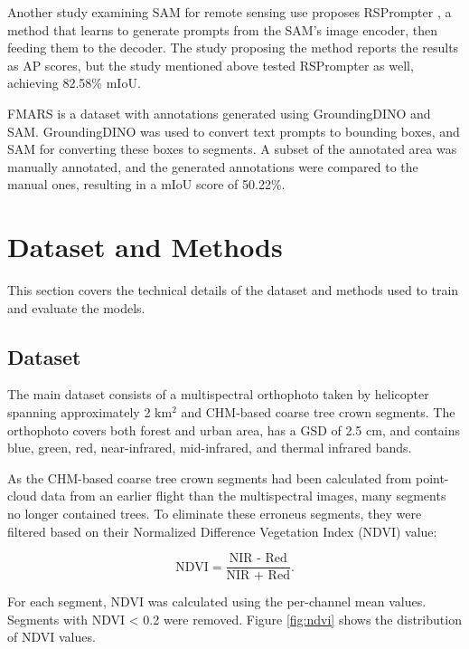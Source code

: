 \documentclass[english, 12pt, a4paper, sci, utf8, a-2b, online]{aaltothesis}
\begin{document}
Another study examining SAM for remote sensing use proposes RSPrompter \cite{rsprompter}, a method that learns to generate prompts from the SAM's image encoder, then feeding them to the decoder. The study proposing the method reports the results as AP scores, but the study mentioned above tested RSPrompter as well, achieving 82.58\% mIoU. \cite{sam-treecrown}

FMARS \cite{fmars} is a dataset with annotations generated using GroundingDINO and SAM. GroundingDINO was used to convert text prompts to bounding boxes, and SAM for converting these boxes to segments. A subset of the annotated area was manually annotated, and the generated annotations were compared to the manual ones, resulting in a mIoU score of 50.22\%.

\newpage
\section{Dataset and Methods}

This section covers the technical details of the dataset and methods used to train and evaluate the models.

\subsection{Dataset}

The main dataset consists of a multispectral orthophoto taken by helicopter spanning approximately 2 km$^2$ and CHM-based coarse tree crown segments. The orthophoto covers both forest and urban area, has a GSD of 2.5 cm, and contains blue, green, red, near-infrared, mid-infrared, and thermal infrared bands.

As the CHM-based coarse tree crown segments had been calculated from point-cloud data from an earlier flight than the multispectral images, many segments no longer contained trees. To eliminate these erroneus segments, they were filtered based on their Normalized Difference Vegetation Index (NDVI) value:

\begin{equation}
\text{NDVI} = \frac{\text{NIR - Red}}{\text{NIR + Red}}.
\end{equation}

For each segment, NDVI was calculated using the per-channel mean values. Segments with NDVI < 0.2 were removed. Figure \ref{fig:ndvi} shows the distribution of NDVI values.
\end{document}
